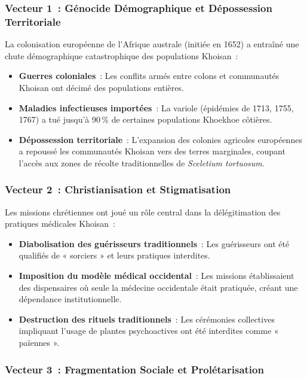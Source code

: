\documentclass[12pt,a4paper,twoside]{book}
\newcommand{\kanna}{\textit{Sceletium tortuosum}}
\begin{document}
\subsubsection{Vecteur 1~: Génocide Démographique et Dépossession Territoriale}

La colonisation européenne de l'Afrique australe (initiée en 1652) a entraîné une chute démographique catastrophique des populations Khoisan~:

\begin{itemize}
\item \textbf{Guerres coloniales}~: Les conflits armés entre colons et communautés Khoisan ont décimé des populations entières.

\item \textbf{Maladies infectieuses importées}~: La variole (épidémies de 1713, 1755, 1767) a tué jusqu'à 90\,\% de certaines populations Khoekhoe côtières.

\item \textbf{Dépossession territoriale}~: L'expansion des colonies agricoles européennes a repoussé les communautés Khoisan vers des terres marginales, coupant l'accès aux zones de récolte traditionnelles de \kanna{}.
\end{itemize}

\subsubsection{Vecteur 2~: Christianisation et Stigmatisation}

Les missions chrétiennes ont joué un rôle central dans la délégitimation des pratiques médicales Khoisan~:

\begin{itemize}
\item \textbf{Diabolisation des guérisseurs traditionnels}~: Les guérisseurs ont été qualifiés de « sorciers » et leurs pratiques interdites.

\item \textbf{Imposition du modèle médical occidental}~: Les missions établissaient des dispensaires où seule la médecine occidentale était pratiquée, créant une dépendance institutionnelle.

\item \textbf{Destruction des rituels traditionnels}~: Les cérémonies collectives impliquant l'usage de plantes psychoactives ont été interdites comme « païennes ».
\end{itemize}

\subsubsection{Vecteur 3~: Fragmentation Sociale et Prolétarisation}
\end{document}
